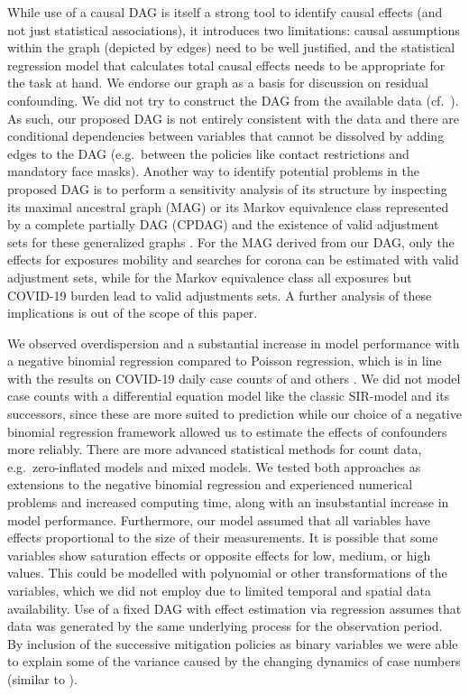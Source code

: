\documentclass[]{elsarticle} %
\begin{document}
While use of a causal DAG is itself a strong tool to identify causal effects (and not just statistical associations), it introduces two limitations: causal assumptions within the graph (depicted by edges) need to be well justified, and the statistical regression model that calculates total causal effects needs to be appropriate for the task at hand. We endorse our graph as a basis for discussion on residual confounding. We did not try to construct the DAG from the available data (cf.~\citep{gencoglu2020causal}). As such, our proposed DAG is not entirely consistent with the data and there are conditional dependencies between variables that cannot be dissolved by adding edges to the DAG (e.g.~between the policies like contact restrictions and mandatory face masks). Another way to identify potential problems in the proposed DAG is to perform a sensitivity analysis of its structure by inspecting its maximal ancestral graph (MAG) or its Markov equivalence class represented by a complete partially DAG (CPDAG) and the existence of valid adjustment sets for these generalized graphs \citep{perkovic2017complete}. For the MAG derived from our DAG, only the effects for exposures mobility and searches for corona can be estimated with valid adjustment sets, while for the Markov equivalence class all exposures but COVID-19 burden lead to valid adjustments sets. A further analysis of these implications is out of the scope of this paper.

We observed overdispersion and a substantial increase in model performance with a negative binomial regression compared to Poisson regression, which is in line with the results on COVID-19 daily case counts of \citet{kraemer_effect_2020} and others \citep{liu_impact_2020, bannister-tyrrell_preliminary_2020, Islamm2743}. We did not model case counts with a differential equation model like the classic SIR-model \citep{kermack1991contributions} and its successors, since these are more suited to prediction \citep[e.g.~][]{rkimodellierung} while our choice of a negative binomial regression framework allowed us to estimate the effects of confounders more reliably. There are more advanced statistical methods for count data, e.g.~zero-inflated models and mixed models. We tested both approaches as extensions to the negative binomial regression and experienced numerical problems and increased computing time, along with an insubstantial increase in model performance. Furthermore, our model assumed that all variables have effects proportional to the size of their measurements. It is possible that some variables show saturation effects or opposite effects for low, medium, or high values. This could be modelled with polynomial or other transformations of the variables, which we did not employ due to limited temporal and spatial data availability. Use of a fixed DAG with effect estimation via regression assumes that data was generated by the same underlying process for the observation period. By inclusion of the successive mitigation policies as binary variables we were able to explain some of the variance caused by the changing dynamics of case numbers (similar to \citep{Islamm2743}).
\end{document}
